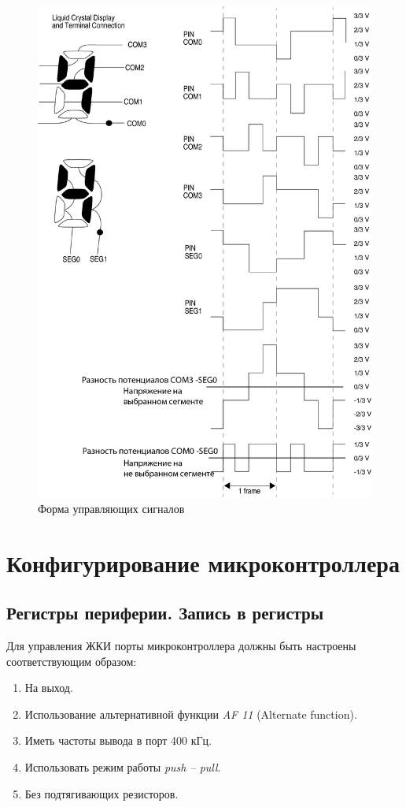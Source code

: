 \begin{figure}[H]
\begin{center}
\includegraphics[scale=0.33]{Image/37.jpg} 
\end{center}
\caption{Форма управляющих сигналов}\label{pit}
\end{figure}

\section{Конфигурирование микроконтроллера}
\subsection{Регистры периферии. Запись в регистры}

Для управления ЖКИ порты микроконтроллера должны быть настроены соответствующим образом:
\begin{enumerate}
\item На выход.
\item Использование альтернативной функции \textit{AF 11} (Alternate function).
\item Иметь частоты вывода в порт 400 кГц.
\item Использовать режим работы \textit{push -- pull}.
\item Без подтягивающих резисторов. 
\end{enumerate}


